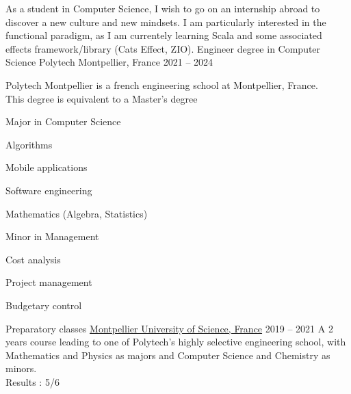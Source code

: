 \documentclass[11pt]{spidercv}
\begin{document}
\begin{MainPart}

  \color{Black}
  As a student in Computer Science, I wish to go on an internship abroad to discover a new culture and new mindsets. I am particularly interested in the functional paradigm, as I am currentely learning Scala and some associated effects framework/library (Cats Effect, ZIO).
  \Experience
  {\ColorHighlight}
  {Engineer degree in Computer Science}
  {Polytech Montpellier, France}
  {2021 -- 2024}
  {
    Polytech Montpellier is a french engineering school at Montpellier, France.\\
    This degree is equivalent to a Master's degree

    \begin{multicols}{2}
      Major in Computer Science
      \begin{ItemList}{\ColorHighlight}
        \item [\ding{226}] Algorithms
        \item [\ding{226}] Mobile applications
        \item [\ding{226}] Software engineering
        \item [\ding{226}] Mathematics (Algebra, Statistics)
      \end{ItemList}
      \columnbreak
      Minor in Management
      \begin{ItemList}{\ColorHighlight}
        \item [\ding{226}] Cost analysis
        \item [\ding{226}] Project management
        \item [\ding{226}] Budgetary control
      \end{ItemList}
    \end{multicols}
  }
  \Experience
  {\ColorHighlight}
  {Preparatory classes}
  {\href{https://www.umontpellier.fr/en/}{Montpellier University of Science, France}}
  {2019 -- 2021}
  {
    A 2 years course leading to one of Polytech's highly selective engineering school, with Mathematics and Physics as majors and Computer Science and Chemistry as minors.\\
    Results : 5/6
  }
  \vspace{0.15cm}


\end{MainPart}
\end{document}
